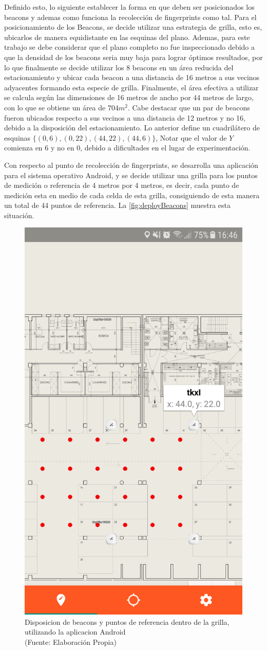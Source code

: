 Definido esto, lo siguiente establecer la forma en que deben ser posicionados los beacons y ademas como funciona la recolección de fingerprints como tal. Para el posicionamiento de los Beacons, se decide utilizar una estrategia de grilla, esto es, ubicarlos de manera equidistante en las esquinas del plano. Ademas, para este trabajo se debe considerar que el plano completo no fue inspeccionado debido a que la densidad de los beacons seria muy baja para lograr óptimos resultados, por lo que finalmente se decide utilizar los 8 beacons en un área reducida del estacionamiento y ubicar cada beacon a una distancia de 16 metros a sus vecinos adyacentes formando esta especie de grilla. Finalmente, el área efectiva a utilizar se calcula según las dimensiones de 16 metros de ancho por 44 metros de largo, con lo que se obtiene un área de $704m^2$. Cabe destacar que un par de beacons fueron ubicados respecto a sus vecinos a una distancia de 12 metros y no 16, debido a la disposición del estacionamiento.  Lo anterior define un cuadrilátero de esquinas $ \{(0,6), (0, 22), (44,22) , (44,6)\} $, Notar que el valor de $Y$ comienza en $6$ y no en $0$, debido a dificultades en el lugar de experimentación.

Con respecto al punto de recolección de fingerprints, se desarrolla una aplicación para el sistema operativo Android, y se decide utilizar una grilla para los puntos de medición o referencia de 4 metros por 4 metros, es decir, cada punto de medición esta en medio de cada celda de esta grilla, consiguiendo de esta manera un total de 44 puntos de referencia. La \autoref{fig:deployBeacons} muestra esta situación.


\begin{figure}[ht!]
\centering
\includegraphics[width=.3\textwidth]{figures/deployBeacons.png}
\caption[abs]{Disposicion de beacons y puntos de referencia dentro de la grilla, utilizando la aplicacion Android\\
{\scriptsize (Fuente: Elaboración Propia)}}
\label{fig:deployBeacons}
\end{figure}

